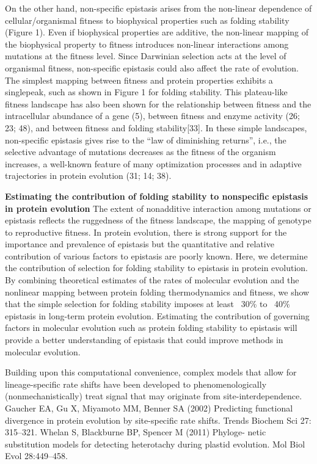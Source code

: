 On the other hand, non-specific epistasis arises from the non-linear dependence of
cellular/organismal fitness to biophysical properties such as folding stability (Figure 1). Even if biophysical properties are additive, the non-linear mapping of the biophysical property to fitness introduces non-linear interactions among mutations at the fitness level. Since Darwinian selection acts at the level of organismal fitness, non-specific epistasis could also affect the rate of evolution. The simplest mapping between fitness and protein properties exhibits a singlepeak, such as shown in Figure 1 for folding stability. This plateau-like fitness landscape has also been shown for the relationship between fitness and the intracellular abundance of a gene (5), between fitness and enzyme activity (26; 23; 48), and between fitness and folding stability[33]. In these simple landscapes, non-specific epistasis gives rise to the “law of diminishing returns”, i.e., the selective advantage of mutations decreases as the fitness of the organism increases, a well-known feature of many optimization processes and in adaptive trajectories in protein evolution (31; 14; 38).

\textbf{Estimating the contribution of folding stability to nonspecific epistasis in protein evolution }
The extent of nonadditive interaction among mutations or epistasis reflects the ruggedness of the fitness landscape, the mapping of genotype to reproductive fitness. In protein evolution, there is strong support for the importance and prevalence of epistasis but the quantitative and relative contribution of various factors to epistasis are poorly known. Here, we determine the contribution of selection for folding stability to epistasis in protein evolution. By combining theoretical estimates of the rates of molecular evolution and the nonlinear mapping between protein folding thermodynamics and fitness, we show that the simple selection for folding stability imposes at least ~30\% to ~40\% epistasis in long-term protein evolution. Estimating the contribution of governing factors in molecular evolution such as protein folding stability to epistasis will provide a better understanding of epistasis that could improve methods in molecular evolution.
 \citet{Dasmeh2018}


Building upon this computational convenience, complex models that allow for lineage-specific rate shifts have been developed to phenomenologically (nonmechanistically) treat signal that may originate from site-interdependence.
Gaucher EA, Gu X, Miyamoto MM, Benner SA (2002) Predicting functional divergence in protein evolution by site-specific rate shifts. Trends Biochem Sci 27: 315–321.
Whelan S, Blackburne BP, Spencer M (2011) Phyloge- netic substitution models for detecting heterotachy during plastid evolution. Mol Biol Evol 28:449–458.



